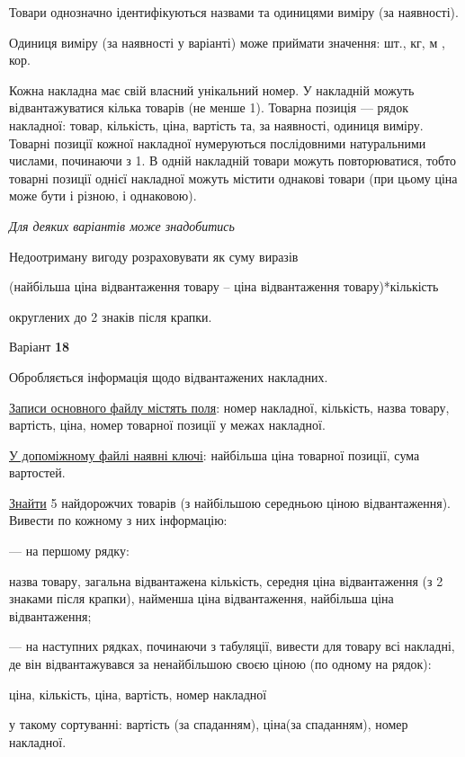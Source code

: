 \documentclass[11pt, ukrainian]{article}
\begin{document}
Товари однозначно ідентифікуються назвами та одиницями виміру (за наявності).

Одиниця виміру (за наявності у варіанті) може приймати значення: шт., кг, м , кор.

Кожна накладна має свій власний унікальний номер.
У накладній можуть відвантажуватися кілька товарів (не менше 1).
Товарна позиція --- рядок накладної: товар, кількість, ціна, вартість та, за наявності, одиниця виміру.
Товарні позиції кожної накладної нумеруються послідовними натуральними числами, починаючи з 1.
В одній накладній товари можуть повторюватися, 
тобто товарні позиції однієї накладної можуть містити однакові товари 
(при цьому ціна може бути і різною, і однаковою).

\bigskip\textit{Для деяких варіантів може знадобитись}

Недоотриману вигоду розраховувати як суму виразів
{\center (найбільша ціна відвантаження товару – ціна відвантаження товару)*кількість\par}

\bigskip
{\noindent} округлених до 2 знаків після крапки.


\par
\newpage
{\center Варіант  \No \textbf { 18 }\par}
\bigskip
Обробляється інформація щодо відвантажених накладних.

\underline{Записи основного файлу містять поля}: номер накладної, кількість, назва товару, вартість, ціна, номер товарної позиції у межах накладної.

\underline{У допоміжному файлі наявні ключі}: найбільша ціна товарної позиції, сума вартостей.

\underline{Знайти} 5 найдорожчих товарів (з найбільшою середньою ціною відвантаження). Вивести по кожному з них інформацію:\par
{\noindent}--- на першому рядку:\par
назва товару, загальна відвантажена кількість, середня ціна відвантаження (з 2 знаками після крапки), найменша ціна відвантаження,  найбільша ціна відвантаження;

{\noindent}--- на наступних рядках, починаючи з табуляції, вивести для товару всі накладні, де він відвантажувався за ненайбільшою своєю ціною (по одному на рядок):\par
ціна, кількість, ціна, вартість, номер накладної

{\noindent}у такому сортуванні: вартість (за спаданням), ціна(за спаданням), номер накладної.
\end{document}
